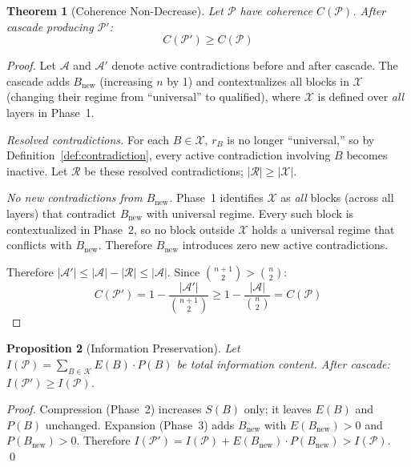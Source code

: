 \documentclass[11pt,a4paper]{article}
\newtheorem{theorem}{Theorem}[section]
\newtheorem{proposition}[theorem]{Proposition}
\theoremstyle{definition}
\begin{document}
\begin{theorem}[Coherence Non-Decrease]\label{thm:coherence}
Let $\mathcal{P}$ have coherence $C(\mathcal{P})$. After cascade producing $\mathcal{P}'$:
\begin{equation}
C(\mathcal{P}') \geq C(\mathcal{P})
\end{equation}
\end{theorem}
\begin{proof}
Let $\mathcal{A}$ and $\mathcal{A}'$ denote active contradictions before and after
cascade. The cascade adds $B_{\text{new}}$ (increasing $n$ by 1) and contextualizes all
blocks in $\mathcal{X}$ (changing their regime from ``universal'' to qualified), where
$\mathcal{X}$ is defined over \emph{all} layers in Phase~1.

\emph{Resolved contradictions.} For each $B \in \mathcal{X}$, $r_B$ is no longer
``universal,'' so by Definition~\ref{def:contradiction}, every active contradiction
involving $B$ becomes inactive. Let $\mathcal{R}$ be these resolved contradictions;
$|\mathcal{R}| \geq |\mathcal{X}|$.

\emph{No new contradictions from $B_{\text{new}}$.} Phase~1 identifies $\mathcal{X}$ as
\emph{all} blocks (across all layers) that contradict $B_{\text{new}}$ with universal
regime. Every such block is contextualized in Phase~2, so no block outside $\mathcal{X}$
holds a universal regime that conflicts with $B_{\text{new}}$. Therefore $B_{\text{new}}$
introduces zero new active contradictions.

Therefore $|\mathcal{A}'| \leq |\mathcal{A}| - |\mathcal{R}| \leq |\mathcal{A}|$.
Since $\binom{n+1}{2} > \binom{n}{2}$:
\begin{equation}
C(\mathcal{P}') = 1 - \frac{|\mathcal{A}'|}{\binom{n+1}{2}} \geq 1 -
\frac{|\mathcal{A}|}{\binom{n}{2}} = C(\mathcal{P})
\end{equation}
\end{proof}

\begin{proposition}[Information Preservation]\label{prop:information}
Let $I(\mathcal{P}) = \sum_{B \in \mathcal{K}} E(B) \cdot P(B)$ be total information
content. After cascade: $I(\mathcal{P}') \geq I(\mathcal{P})$.
\end{proposition}
\begin{proof}
Compression (Phase~2) increases $S(B)$ only; it leaves $E(B)$ and $P(B)$ unchanged.
Expansion (Phase~3) adds $B_{\text{new}}$ with $E(B_{\text{new}}) > 0$ and
$P(B_{\text{new}}) > 0$. Therefore $I(\mathcal{P}') = I(\mathcal{P}) +
E(B_{\text{new}}) \cdot P(B_{\text{new}}) > I(\mathcal{P})$. \qed
\end{proof}
\end{document}
